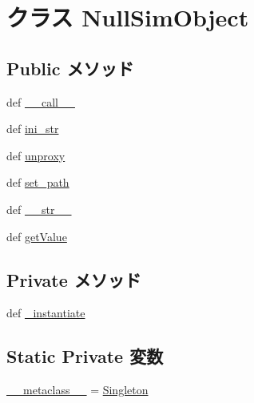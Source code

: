 \hypertarget{classm5_1_1params_1_1NullSimObject}{
\section{クラス NullSimObject}
\label{classm5_1_1params_1_1NullSimObject}
}
\subsection*{Public メソッド}
\begin{DoxyCompactItemize}
\item 
def \hyperlink{classm5_1_1params_1_1NullSimObject_ae844e0019d38360a86bac1474132db3c}{\_\-\_\-call\_\-\_\-}
\item 
def \hyperlink{classm5_1_1params_1_1NullSimObject_a33ebe6cd32bcbd15465fc28b9d94bf82}{ini\_\-str}
\item 
def \hyperlink{classm5_1_1params_1_1NullSimObject_a587cd3c1e899640dc09d63793aa8093b}{unproxy}
\item 
def \hyperlink{classm5_1_1params_1_1NullSimObject_a2936eb8d5f8be9897b3f42bfed105e62}{set\_\-path}
\item 
def \hyperlink{classm5_1_1params_1_1NullSimObject_aa7a4b9bc0941308e362738503137460e}{\_\-\_\-str\_\-\_\-}
\item 
def \hyperlink{classm5_1_1params_1_1NullSimObject_acc340fbd4335fa34f9d57fb454b28ed0}{getValue}
\end{DoxyCompactItemize}
\subsection*{Private メソッド}
\begin{DoxyCompactItemize}
\item 
def \hyperlink{classm5_1_1params_1_1NullSimObject_a84644d8fb6ace7953f0e78dec1ebce59}{\_\-instantiate}
\end{DoxyCompactItemize}
\subsection*{Static Private 変数}
\begin{DoxyCompactItemize}
\item 
\hyperlink{classm5_1_1params_1_1NullSimObject_adfc4d1824f4ecdcbb04ceafc5bbc933e}{\_\-\_\-metaclass\_\-\_\-} = \hyperlink{classm5_1_1util_1_1Singleton}{Singleton}
\end{DoxyCompactItemize}


